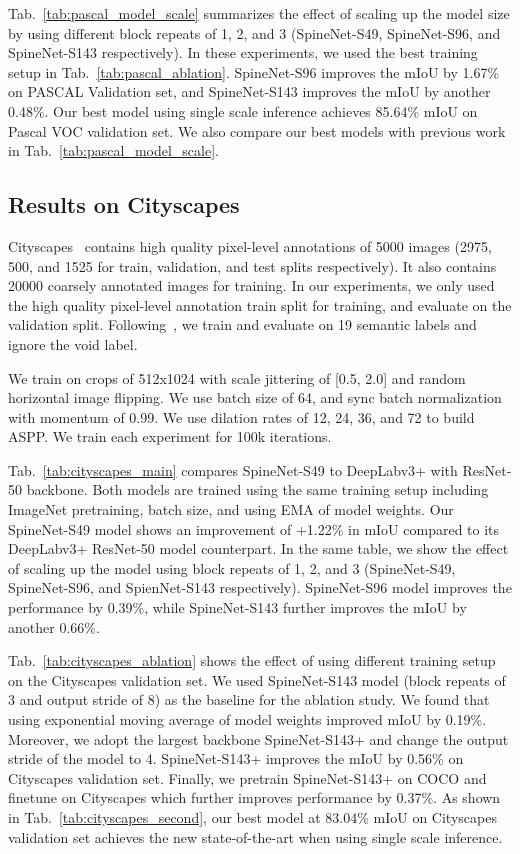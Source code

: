 \documentclass[10pt,twocolumn,letterpaper]{article}
\begin{document}
Tab.~\ref{tab:pascal_model_scale} summarizes the effect of scaling up the model size by using different block repeats of 1, 2, and 3 (SpineNet-S49, SpineNet-S96, and SpineNet-S143 respectively). In these experiments, we used the best training setup in Tab.~\ref{tab:pascal_ablation}. SpineNet-S96 improves the mIoU by 1.67\% on PASCAL Validation set, and SpineNet-S143 improves the mIoU by another 0.48\%. Our best model using single scale inference achieves 85.64\% mIoU on Pascal VOC validation set. We also compare our best models with previous work in Tab.~\ref{tab:pascal_model_scale}.


\subsection{Results on Cityscapes}
Cityscapes~\cite{Cordts2016Cityscapes} contains high quality pixel-level annotations of 5000 images (2975, 500, and 1525 for train, validation, and test splits respectively). It also contains 20000 coarsely annotated images for training. In our experiments, we only used the high quality pixel-level annotation train split for training, and evaluate on the validation split. Following~\cite{Cordts2016Cityscapes}, we train and evaluate on 19 semantic labels and ignore the void label.

We train on crops of 512x1024 with scale jittering of [0.5, 2.0] and random horizontal image flipping. We use batch size of 64, and sync batch normalization with momentum of 0.99. We use dilation rates of 12, 24, 36, and 72 to build ASPP. We train each experiment for 100k iterations.


Tab.~\ref{tab:cityscapes_main} compares SpineNet-S49 to DeepLabv3+ with ResNet-50 backbone. Both models are trained using the same training setup including ImageNet pretraining, batch size, and using EMA of model weights. Our SpineNet-S49 model shows an improvement of +1.22\% in mIoU compared to its DeepLabv3+ ResNet-50 model counterpart. In the same table, we show the effect of scaling up the model using block repeats of 1, 2, and 3 (SpineNet-S49, SpineNet-S96, and SpienNet-S143 respectively). SpineNet-S96 model improves the performance by 0.39\%, while SpineNet-S143 further improves the mIoU by another 0.66\%.

Tab.~\ref{tab:cityscapes_ablation} shows the effect of using different training setup on the Cityscapes validation set. We used SpineNet-S143 model (block repeats of 3 and output stride of 8) as the baseline for the ablation study. We found that using exponential moving average of model weights improved mIoU by 0.19\%. Moreover, we adopt the largest backbone SpineNet-S143+ and change the output stride of the model to 4. SpineNet-S143+ improves the mIoU by 0.56\% on Cityscapes validation set. Finally, we pretrain SpineNet-S143+ on COCO and finetune on Cityscapes which further improves performance by 0.37\%. As shown in Tab.~\ref{tab:cityscapes_second}, our best model at 83.04\% mIoU on Cityscapes validation set achieves the new state-of-the-art when using single scale inference.
\end{document}
